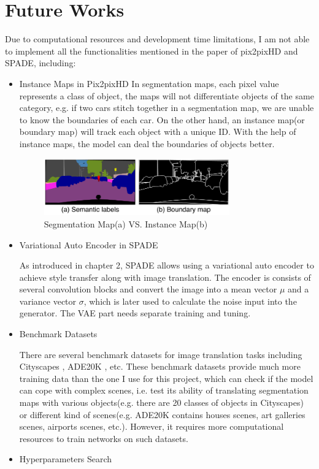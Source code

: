 \section{Future Works}
\label{sec:future work}
Due to computational resources and development time limitations, I am not able 
to implement all the functionalities mentioned in the paper of pix2pixHD\cite{wang2018pix2pixHD}
and SPADE\cite{park2019SPADE}, including:
\begin{itemize}
    \item Instance Maps in Pix2pixHD
    In segmentation maps, each pixel value represents a class of object, the maps will not 
    differentiate objects of the same category, e.g. if two cars stitch together in a 
    segmentation map, we are unable to know the boundaries of each car. On the other hand, 
    an instance map(or boundary map) will track each object with a unique ID. With the help 
    of instance maps, the model can deal the boundaries of objects better.
    \begin{figure}[H]
        \begin{center}
        \includegraphics[width=8cm]{figures/instance-map}
        \end{center}
        \caption{Segmentation Map(a) VS. Instance Map(b)}
        \label{fig:instance-map}
    \end{figure}
    \item Variational Auto Encoder in SPADE
    
    As introduced in chapter 2, SPADE allows using a variational auto encoder to achieve 
    style transfer along with image translation. The encoder is consists of several 
    convolution blocks and convert the image into a mean vector $\mu$ and a variance vector
    $\sigma$, which is later used to calculate the noise input into the generator. 
    The VAE part needs separate training and tuning.
    \item Benchmark Datasets
    
    \nocite{zhou2016semantic}
    There are several benchmark datasets for image translation tasks including 
    Cityscapes \cite{Cordts2016Cityscapes}, ADE20K \cite{zhou2017scene}, etc. These 
    benchmark datasets provide much more training data than the one I use for 
    this project, which can check if the model can cope with complex scenes, i.e. test its ability of 
    translating segmentation maps with various objects(e.g. there are 20 classes of objects in Cityscapes) 
    or different kind of scenes(e.g. ADE20K contains houses scenes, art galleries scenes, airports 
    scenes, etc.). 
    However, it requires more computational resources to train networks on such 
    datasets.
    \item Hyperparameters Search
    

\end{itemize}
